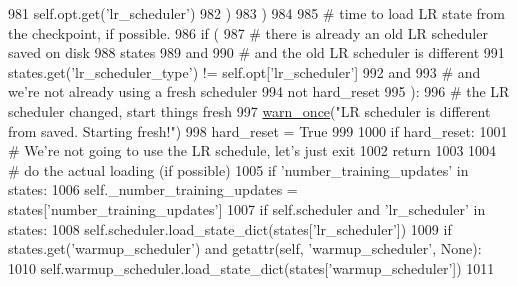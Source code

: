 \begin{DoxyCode}
981                     self.opt.get(\textcolor{stringliteral}{'lr\_scheduler'})
982                 )
983             )
984 
985         \textcolor{comment}{# time to load LR state from the checkpoint, if possible.}
986         \textcolor{keywordflow}{if} (
987             \textcolor{comment}{# there is already an old LR scheduler saved on disk}
988             states
989             \textcolor{keywordflow}{and}
990             \textcolor{comment}{# and the old LR scheduler is different}
991             states.get(\textcolor{stringliteral}{'lr\_scheduler\_type'}) != self.opt[\textcolor{stringliteral}{'lr\_scheduler'}]
992             \textcolor{keywordflow}{and}
993             \textcolor{comment}{# and we're not already using a fresh scheduler}
994             \textcolor{keywordflow}{not} hard\_reset
995         ):
996             \textcolor{comment}{# the LR scheduler changed, start things fresh}
997             \hyperlink{namespaceparlai_1_1utils_1_1misc_acf146e70ea7f6867969a7c2b545d4b4b}{warn\_once}(\textcolor{stringliteral}{"LR scheduler is different from saved. Starting fresh!"})
998             hard\_reset = \textcolor{keyword}{True}
999 
1000         \textcolor{keywordflow}{if} hard\_reset:
1001             \textcolor{comment}{# We're not going to use the LR schedule, let's just exit}
1002             \textcolor{keywordflow}{return}
1003 
1004         \textcolor{comment}{# do the actual loading (if possible)}
1005         \textcolor{keywordflow}{if} \textcolor{stringliteral}{'number\_training\_updates'} \textcolor{keywordflow}{in} states:
1006             self.\_number\_training\_updates = states[\textcolor{stringliteral}{'number\_training\_updates'}]
1007         \textcolor{keywordflow}{if} self.scheduler \textcolor{keywordflow}{and} \textcolor{stringliteral}{'lr\_scheduler'} \textcolor{keywordflow}{in} states:
1008             self.scheduler.load\_state\_dict(states[\textcolor{stringliteral}{'lr\_scheduler'}])
1009         \textcolor{keywordflow}{if} states.get(\textcolor{stringliteral}{'warmup\_scheduler'}) \textcolor{keywordflow}{and} getattr(self, \textcolor{stringliteral}{'warmup\_scheduler'}, \textcolor{keywordtype}{None}):
1010             self.warmup\_scheduler.load\_state\_dict(states[\textcolor{stringliteral}{'warmup\_scheduler'}])
1011 
\end{DoxyCode}
\mbox{\label{classparlai_1_1core_1_1torch__agent_1_1TorchAgent_a9a21fa33fa5b2b928024fbc67826f233}} 
